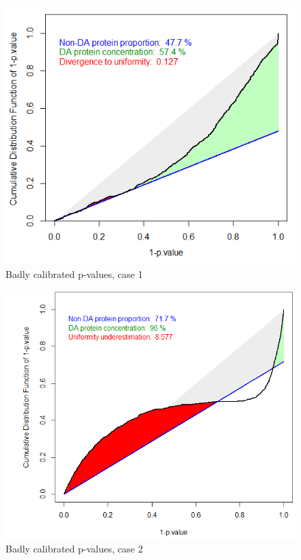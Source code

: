 \documentclass[12pt]{article}
\begin{document}
\begin {figure}
\includegraphics[width=\textwidth]{images/cp4p-pb1.png}
\caption{Badly calibrated p-values, case 1}\label{fig:cp4p-pb1}
\end {figure}


\begin {figure}
\includegraphics[width=\textwidth]{images/cp4p-pb2.png}
\caption{Badly calibrated p-values, case 2}\label{fig:cp4p-pb2}
\end {figure}
\end{document}
